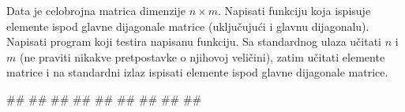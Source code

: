 \begin{Answer}[ref=2_19]
\end{Answer}

\begin{Exercise}[label=2_20]
Data je celobrojna matrica dimenzije $n \times m$.
Napisati funkciju koja ispisuje elemente ispod glavne dijagonale matrice 
(uključujući i glavnu dijagonalu).
Napisati program koji testira napisanu funkciju. Sa standardnog
ulaza učitati $n$ i $m$ (ne praviti nikakve
pretpostavke o njihovoj veličini), zatim učitati elemente
matrice i na standardni izlaz ispisati elemente ispod glavne
dijagonale matrice.

\begin{miditest}
\begin{upotreba}{1}
#\naslovInt#
##
##
##
##
##
##
##
##
\end{upotreba}
\end{miditest}

\end{Exercise}
\begin{Answer}[ref=2_20]
\end{Answer}

